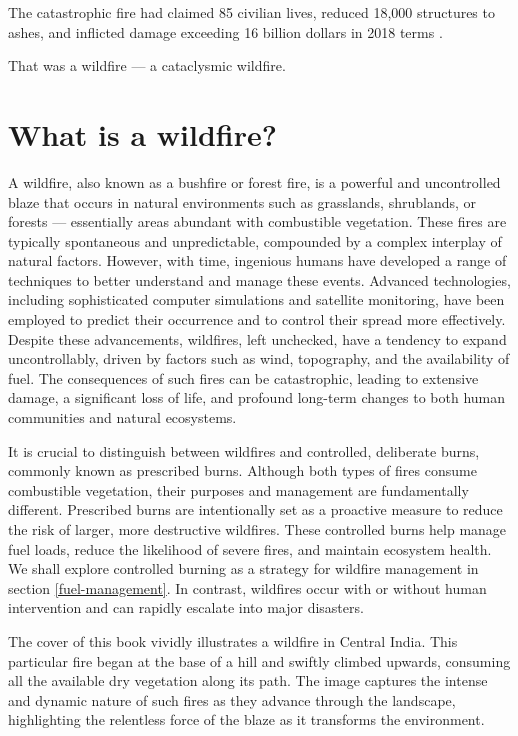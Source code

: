 \documentclass[
  12 pt,
]{Nemilov}
\begin{document}
The catastrophic fire had claimed 85 civilian lives, reduced 18,000 structures to ashes, and inflicted damage exceeding 16 billion dollars in 2018 terms \citep{johnson2022paradise}.

That was a wildfire --- a cataclysmic wildfire.

\section{What is a wildfire?}\label{what-is-a-wildfire}

A wildfire, also known as a bushfire or forest fire, is a powerful and uncontrolled blaze that occurs in natural environments such as grasslands, shrublands, or forests --- essentially areas abundant with combustible vegetation. These fires are typically spontaneous and unpredictable, compounded by a complex interplay of natural factors. However, with time, ingenious humans have developed a range of techniques to better understand and manage these events. Advanced technologies, including sophisticated computer simulations and satellite monitoring, have been employed to predict their occurrence and to control their spread more effectively. Despite these advancements, wildfires, left unchecked, have a tendency to expand uncontrollably, driven by factors such as wind, topography, and the availability of fuel. The consequences of such fires can be catastrophic, leading to extensive damage, a significant loss of life, and profound long-term changes to both human communities and natural ecosystems.

It is crucial to distinguish between wildfires and controlled, deliberate burns, commonly known as prescribed burns. Although both types of fires consume combustible vegetation, their purposes and management are fundamentally different. Prescribed burns are intentionally set as a proactive measure to reduce the risk of larger, more destructive wildfires. These controlled burns help manage fuel loads, reduce the likelihood of severe fires, and maintain ecosystem health. We shall explore controlled burning as a strategy for wildfire management in section \ref{fuel-management}. In contrast, wildfires occur with or without human intervention and can rapidly escalate into major disasters.

The cover of this book vividly illustrates a wildfire in Central India. This particular fire began at the base of a hill and swiftly climbed upwards, consuming all the available dry vegetation along its path. The image captures the intense and dynamic nature of such fires as they advance through the landscape, highlighting the relentless force of the blaze as it transforms the environment.
\end{document}
